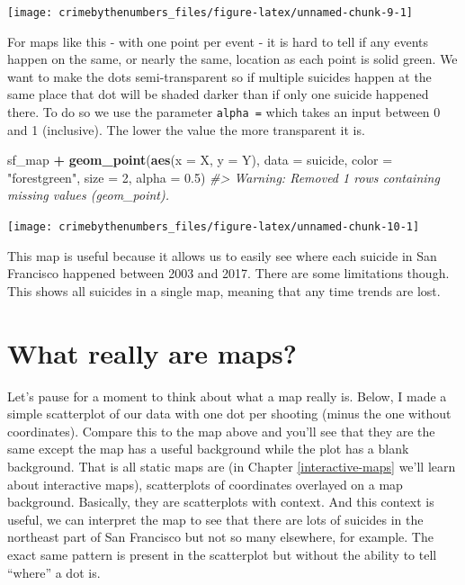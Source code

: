 \documentclass[
  12pt,
]{book}
\newenvironment{Shaded}{\begin{snugshade}}{\end{snugshade}}
\newcommand{\CommentTok}[1]{\textcolor[rgb]{0.37,0.37,0.37}{\textit{#1}}}
\newcommand{\DataTypeTok}[1]{\textcolor[rgb]{0.27,0.27,0.27}{#1}}
\newcommand{\DecValTok}[1]{\textcolor[rgb]{0.06,0.06,0.06}{#1}}
\newcommand{\FloatTok}[1]{\textcolor[rgb]{0.06,0.06,0.06}{#1}}
\newcommand{\KeywordTok}[1]{\textcolor[rgb]{0.27,0.27,0.27}{\textbf{#1}}}
\newcommand{\NormalTok}[1]{#1}
\newcommand{\OperatorTok}[1]{\textcolor[rgb]{0.43,0.43,0.43}{\textbf{#1}}}
\newcommand{\StringTok}[1]{\textcolor[rgb]{0.5,0.5,0.5}{#1}}
\begin{document}
\begin{center}\texttt{[image: crimebythenumbers\_files/figure-latex/unnamed-chunk-9-1]} \end{center}

For maps like this - with one point per event - it is hard to tell if any events happen on the same, or nearly the same, location as each point is solid green. We want to make the dots semi-transparent so if multiple suicides happen at the same place that dot will be shaded darker than if only one suicide happened there. To do so we use the parameter \texttt{alpha\ =} which takes an input between 0 and 1 (inclusive). The lower the value the more transparent it is.

\begin{Shaded}
\begin{Highlighting}[]
\NormalTok{sf\_map }\OperatorTok{+}
\StringTok{  }\KeywordTok{geom\_point}\NormalTok{(}\KeywordTok{aes}\NormalTok{(}\DataTypeTok{x =}\NormalTok{ X, }\DataTypeTok{y =}\NormalTok{ Y),}
             \DataTypeTok{data  =}\NormalTok{ suicide,}
             \DataTypeTok{color =} \StringTok{"forestgreen"}\NormalTok{,}
             \DataTypeTok{size  =} \DecValTok{2}\NormalTok{,}
             \DataTypeTok{alpha =} \FloatTok{0.5}\NormalTok{)}
\CommentTok{\#\textgreater{} Warning: Removed 1 rows containing missing values (geom\_point).}
\end{Highlighting}
\end{Shaded}

\begin{center}\texttt{[image: crimebythenumbers\_files/figure-latex/unnamed-chunk-10-1]} \end{center}

This map is useful because it allows us to easily see where each suicide in San Francisco happened between 2003 and 2017. There are some limitations though. This shows all suicides in a single map, meaning that any time trends are lost.

\hypertarget{what-really-are-maps}{%
\section{What really are maps?}\label{what-really-are-maps}}

Let's pause for a moment to think about what a map really is. Below, I made a simple scatterplot of our data with one dot per shooting (minus the one without coordinates). Compare this to the map above and you'll see that they are the same except the map has a useful background while the plot has a blank background. That is all static maps are (in Chapter \ref{interactive-maps} we'll learn about interactive maps), scatterplots of coordinates overlayed on a map background. Basically, they are scatterplots with context. And this context is useful, we can interpret the map to see that there are lots of suicides in the northeast part of San Francisco but not so many elsewhere, for example. The exact same pattern is present in the scatterplot but without the ability to tell ``where'' a dot is.
\end{document}
